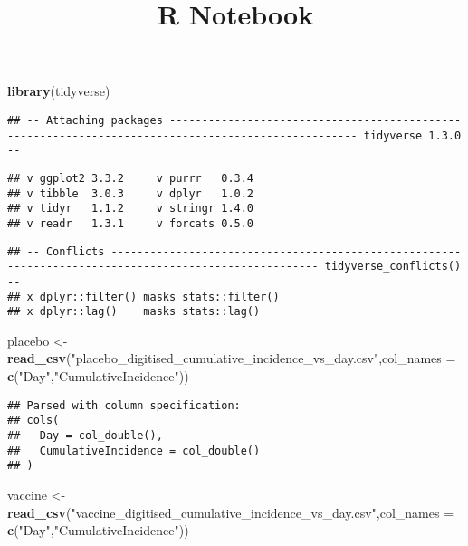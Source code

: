 \documentclass[
]{article}
\title{R Notebook}
\author{}
\date{\vspace{-2.5em}}
\newenvironment{Shaded}{\begin{snugshade}}{\end{snugshade}}
\newcommand{\DataTypeTok}[1]{\textcolor[rgb]{0.13,0.29,0.53}{#1}}
\newcommand{\KeywordTok}[1]{\textcolor[rgb]{0.13,0.29,0.53}{\textbf{#1}}}
\newcommand{\NormalTok}[1]{#1}
\newcommand{\StringTok}[1]{\textcolor[rgb]{0.31,0.60,0.02}{#1}}
\begin{document}
\maketitle

\begin{Shaded}
\begin{Highlighting}[]
\KeywordTok{library}\NormalTok{(tidyverse)}
\end{Highlighting}
\end{Shaded}

\begin{verbatim}
## -- Attaching packages --------------------------------------------------------------------------------------------------- tidyverse 1.3.0 --
\end{verbatim}

\begin{verbatim}
## v ggplot2 3.3.2     v purrr   0.3.4
## v tibble  3.0.3     v dplyr   1.0.2
## v tidyr   1.1.2     v stringr 1.4.0
## v readr   1.3.1     v forcats 0.5.0
\end{verbatim}

\begin{verbatim}
## -- Conflicts ------------------------------------------------------------------------------------------------------ tidyverse_conflicts() --
## x dplyr::filter() masks stats::filter()
## x dplyr::lag()    masks stats::lag()
\end{verbatim}

\begin{Shaded}
\begin{Highlighting}[]
\NormalTok{placebo <-}\StringTok{ }\KeywordTok{read_csv}\NormalTok{(}\StringTok{"placebo_digitised_cumulative_incidence_vs_day.csv"}\NormalTok{,}\DataTypeTok{col_names =} \KeywordTok{c}\NormalTok{(}\StringTok{"Day"}\NormalTok{,}\StringTok{"CumulativeIncidence"}\NormalTok{))}
\end{Highlighting}
\end{Shaded}

\begin{verbatim}
## Parsed with column specification:
## cols(
##   Day = col_double(),
##   CumulativeIncidence = col_double()
## )
\end{verbatim}

\begin{Shaded}
\begin{Highlighting}[]
\NormalTok{vaccine <-}\StringTok{ }\KeywordTok{read_csv}\NormalTok{(}\StringTok{"vaccine_digitised_cumulative_incidence_vs_day.csv"}\NormalTok{,}\DataTypeTok{col_names =} \KeywordTok{c}\NormalTok{(}\StringTok{"Day"}\NormalTok{,}\StringTok{"CumulativeIncidence"}\NormalTok{))}
\end{Highlighting}
\end{Shaded}
\end{document}

